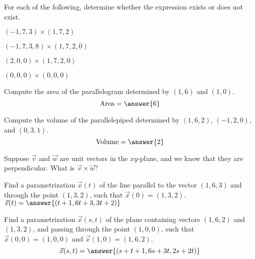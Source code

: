 \documentclass{ximera}
\begin{document}
\begin{problem}
For each of the following, determine whether the expression exists or does not exist.

$(-1,7,3)\times(1,7,2)$
\begin{multipleChoice}
\end{multipleChoice}

$(-1,7,3,8)\times(1,7,2,0)$
\begin{multipleChoice}
\end{multipleChoice}

$(2,0,0)\times(1,7,2,0)$
\begin{multipleChoice}
\end{multipleChoice}

$(0,0,0)\times(0,0,0)$
\begin{multipleChoice}
\end{multipleChoice}
\end{problem}

\begin{problem}
Compute the area of the parallelogram determined by $(1,6)$ and $(1,0)$.
\[
\textrm{Area} = \answer{6}
\]
\end{problem}

\begin{problem}
Compute the volume of the parallelepiped determined by $(1,6,2)$, $(-1,2,0)$, and $(0,3,1)$.
\[
\textrm{Volume} = \answer{2}
\]
\end{problem}

\begin{problem}
Suppose $\vec{v}$ and $\vec{w}$ are unit vectors in the $xy$-plane, and we know that they are perpendicular. What is $\vec{v}\times\vec{w}$?
\begin{multipleChoice}
\end{multipleChoice}
\end{problem}

\begin{problem}
Find a parametrization $\vec{x}(t)$ of the line parallel to the vector $(1,6,3)$ and through the point $(1,3,2)$, such that $\vec{x}(0) = (1,3,2)$.
$\vec{x}(t) = \answer{(t+1,6t+3,3t+2)}$
\end{problem}

\begin{problem}
Find a parametrization $\vec{x}(s,t)$ of the plane containing vectors $(1,6,2)$ and $(1,3,2)$, and passing through the point $(1,0,0)$, such that $\vec{x}(0,0) = (1,0,0)$ and $\vec{x}(1,0) = (1,6,2)$.
\[
\vec{x}(s,t) = \answer{(s+t+1, 6s+3t, 2s+2t)}
\]
\end{problem}
\end{document}
